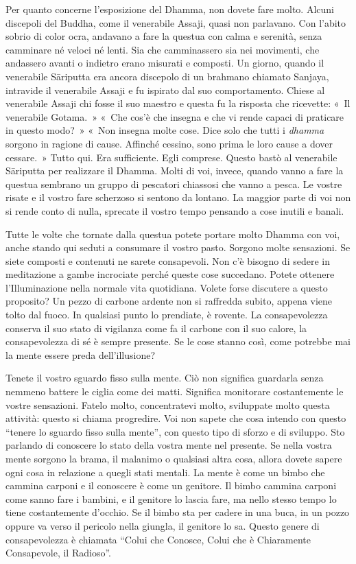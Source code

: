 Per quanto concerne l'esposizione del Dhamma, non dovete fare molto.
Alcuni discepoli del Buddha, come il venerabile Assaji, quasi non
parlavano. Con l'abito sobrio di color ocra, andavano a fare la questua
con calma e serenità, senza camminare né veloci né lenti. Sia che
camminassero sia nei movimenti, che andassero avanti o indietro erano
misurati e composti. Un giorno, quando il venerabile Sāriputta era
ancora discepolo di un brahmano chiamato Sanjaya, intravide il
venerabile Assaji e fu ispirato dal suo comportamento. Chiese al
venerabile Assaji chi fosse il suo maestro e questa fu la risposta che
ricevette: «~Il venerabile Gotama.~» «~Che cos'è che insegna e che vi
rende capaci di praticare in questo modo?~» «~Non insegna molte cose.
Dice solo che tutti i \emph{dhamma} sorgono in ragione di cause.
Affinché cessino, sono prima le loro cause a dover cessare.~» Tutto qui.
Era sufficiente. Egli comprese. Questo bastò al venerabile Sāriputta per
realizzare il Dhamma. Molti di voi, invece, quando vanno a fare la
questua sembrano un gruppo di pescatori chiassosi che vanno a pesca. Le
vostre risate e il vostro fare scherzoso si sentono da lontano. La
maggior parte di voi non si rende conto di nulla, sprecate il vostro
tempo pensando a cose inutili e banali.

Tutte le volte che tornate dalla questua potete portare molto Dhamma con
voi, anche stando qui seduti a consumare il vostro pasto. Sorgono molte
sensazioni. Se siete composti e contenuti ne sarete consapevoli. Non c'è
bisogno di sedere in meditazione a gambe incrociate perché queste cose
succedano. Potete ottenere l'Illuminazione nella normale vita
quotidiana. Volete forse discutere a questo proposito? Un pezzo di
carbone ardente non si raffredda subito, appena viene tolto dal fuoco.
In qualsiasi punto lo prendiate, è rovente. La consapevolezza conserva
il suo stato di vigilanza come fa il carbone con il suo calore, la
consapevolezza di sé è sempre presente. Se le cose stanno così, come
potrebbe mai la mente essere preda dell'illusione?

Tenete il vostro sguardo fisso sulla mente. Ciò non significa guardarla
senza nemmeno battere le ciglia come dei matti. Significa monitorare
costantemente le vostre sensazioni. Fatelo molto, concentratevi molto,
sviluppate molto questa attività: questo si chiama progredire. Voi non
sapete che cosa intendo con questo ``tenere lo sguardo fisso sulla
mente'', con questo tipo di sforzo e di sviluppo. Sto parlando di
conoscere lo stato della vostra mente nel presente. Se nella vostra
mente sorgono la brama, il malanimo o qualsiasi altra cosa, allora
dovete sapere ogni cosa in relazione a quegli stati mentali. La mente è
come un bimbo che cammina carponi e il conoscere è come un genitore. Il
bimbo cammina carponi come sanno fare i bambini, e il genitore lo lascia
fare, ma nello stesso tempo lo tiene costantemente d'occhio. Se il bimbo
sta per cadere in una buca, in un pozzo oppure va verso il pericolo
nella giungla, il genitore lo sa. Questo genere di consapevolezza è
chiamata ``Colui che Conosce, Colui che è Chiaramente Consapevole, il
Radioso''.


